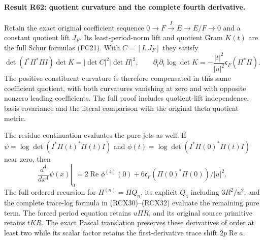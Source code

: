 \paragraph{Result R62: quotient curvature and the complete fourth derivative.}
Retain the exact original coefficient sequence
$0\to F\xrightarrow I E\to E/F\to0$ and a constant quotient lift
$J_F$. Its least-period-norm lift and quotient Gram $K(t)$ are the
full Schur formulas (FC21). With $C=[I,J_F]$ they satisfy
\[
 \det(I^*\Pi^*\Pi I)\det K
      =|\det C|^2|\det\Pi|^2,
 \qquad
 \partial_{\bar t}\partial_t\log\det K
      =-\frac{|t|^2}{|u|^2}\mathfrak c_F(\Pi^*\Pi).
\]
The positive constituent curvature is therefore compensated in this
same coefficient quotient, with both curvatures vanishing at zero
and with opposite nonzero leading coefficients. The full proof
includes quotient-lift independence, basis covariance and the
literal comparison with the original theta quotient metric.

The residue continuation evaluates the pure jets as well. If
$\psi=\log\det(I^*\Pi(t)^*\Pi(t)I)$ and
$\phi(t)=\log\det(I^*\Pi(0)^*\Pi(t)I)$ near zero, then
\[
 \left.\frac{d^4}{dx^4}\psi(x)\right|_0
   =2\operatorname{Re}\phi^{(4)}(0)
       +6\mathfrak c_F(\Pi(0)^*\Pi(0))/|u|^2.
\]
The full ordered recursion for $\Pi^{(n)}=\Pi Q_n$, its explicit
$Q_4$ including $3R^2/u^2$, and the complete trace-log formula in
(RCX30)--(RCX32) evaluate the remaining pure term. The forced
period equation retains $u\Pi R$, and its original source
primitive retains $tKR$. The exact Pascal translation preserves
these derivatives of order at least two while its scalar factor
retains the first-derivative trace shift $2p\operatorname{Re}a$.
